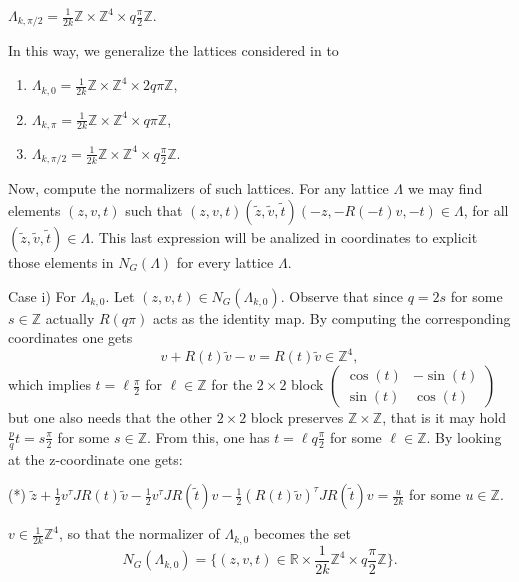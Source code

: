\documentclass[11pt]{amsart}
\theoremstyle{plain}
\theoremstyle{definition}
\theoremstyle{remark}
\begin{document}
  $\Lambda_{k,\pi/2}=\frac1{2k} \mathbb Z\times \mathbb Z^4 \times q\frac{\pi}2 \mathbb Z$.
  
  In this way, we generalize the lattices considered in \cite{BOV} to 
  \begin{enumerate}
  	\item $\Lambda_{k,0}=\frac1{2k} \mathbb Z\times \mathbb Z^4 \times 2q\pi\mathbb Z$,
  	\item $\Lambda_{k,\pi}=\frac1{2k} \mathbb Z\times \mathbb Z^4 \times q\pi\mathbb Z$,
  	\item $\Lambda_{k,\pi/2}=\frac1{2k} \mathbb Z\times \mathbb Z^4 \times q\frac{\pi}2 \mathbb Z$.
  	\end{enumerate}
  
  Now, compute the normalizers of such lattices. For any lattice $\Lambda$ we may find elements $(z,v,t)$ such  that
  $(z,v,t)(\tilde{z},\tilde{v},\tilde{t})(-z,-R(-t)v,-t)\in \Lambda$, for  all $(\tilde{z},\tilde{v},\tilde{t})\in \Lambda$. This last expression will be analized in coordinates to explicit those elements in $N_G(\Lambda)$ for every lattice $\Lambda$.
  
 
  
   Case i) For $\Lambda_{k,0}$.   Let $(z,v,t)\in N_G(\Lambda_{k,0})$.  Observe that since  $q=2s$ for some $s\in \mathbb Z$  actually   $R(q\pi)$ acts as the identity map.  By computing the corresponding coordinates one gets
  $$v + R(t)\tilde{v}-v= R(t)\tilde{v}\in \mathbb Z^4,$$
  which implies $t= \ell\frac{\pi}2$ for $\ell\in \mathbb Z$ for the $2\times 2$ block $\left( \begin{matrix}
  	\cos(t) & -\sin(t)\\ \sin(t) & \cos(t) 
  \end{matrix}\right)$ but one also needs that  the other $2\times 2$ block preserves $\mathbb Z \times \mathbb Z$, that is it may hold $\frac{p}q t = s\frac{\pi}2$ for some $s\in \mathbb Z$. From this, one has $t=\ell q\frac{\pi}2$ for some $\ell \in \mathbb Z$.  By looking at the z-coordinate one gets:
  
  \smallskip
  
 (*) \quad  $\tilde{z}+\frac12 v^{\tau}JR(t)\tilde{v}-\frac12 v^{\tau}JR(\tilde{t})v-\frac12(R(t)\tilde{v})^{\tau}JR(\tilde{t})v= \frac{u}{2k}$ for some $u\in \mathbb Z$. 
  
  \smallskip
  
  $v\in \frac{1}{2k}\mathbb Z^4$, so that the normalizer of $\Lambda_{k,0}$ becomes the set 
  \begin{equation}\label{normalizer1}N_G(\Lambda_{k,0})=\{(z,v,t)\in \mathbb R\times \frac{1}{2k}\mathbb Z^4\times q\frac{\pi}2\mathbb Z\}.
  \end{equation}
  
\end{document}

